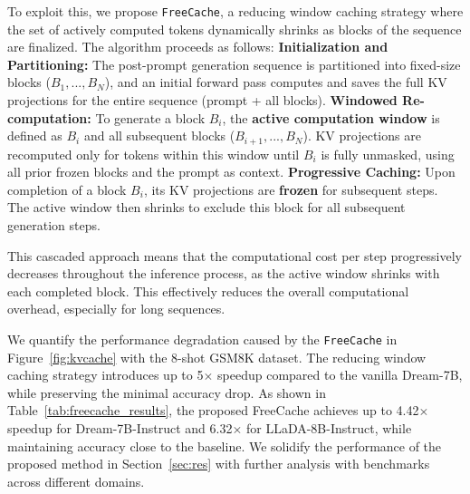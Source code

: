 To exploit this, we propose \texttt{FreeCache}, a reducing window caching strategy where the set of actively computed tokens dynamically shrinks as blocks of the sequence are finalized. The algorithm proceeds as follows: \textbf{Initialization and Partitioning:} The post-prompt generation sequence is partitioned into fixed-size blocks ($B_1, ..., B_N$), and an initial forward pass computes and saves the full KV projections for the entire sequence (prompt + all blocks). \textbf{Windowed Re-computation:} To generate a block $B_i$, the \textbf{active computation window} is defined as $B_i$ and all subsequent blocks ($B_{i+1}, ..., B_N$). KV projections are recomputed only for tokens within this window until $B_i$ is fully unmasked, using all prior frozen blocks and the prompt as context. \textbf{Progressive Caching:} Upon completion of a block $B_i$, its KV projections are \textbf{frozen} for subsequent steps. The active window then shrinks to exclude this block for all subsequent generation steps.

This cascaded approach means that the computational cost per step progressively decreases throughout the inference process, as the active window shrinks with each completed block. This effectively reduces the overall computational overhead, especially for long sequences.


We quantify the performance degradation caused by the \texttt{FreeCache} in Figure~\ref{fig:kvcache} with the 8-shot GSM8K dataset. 
The reducing window caching strategy introduces up to 5$\times$ speedup compared to the vanilla Dream-7B, while preserving the minimal accuracy drop. As shown in Table~\ref{tab:freecache_results}, the proposed FreeCache achieves up to 4.42$\times$ speedup for Dream-7B-Instruct and 6.32$\times$ for LLaDA-8B-Instruct, while maintaining accuracy close to the baseline. We solidify the performance of the proposed method in Section~\ref{sec:res} with further analysis with benchmarks across different domains.






